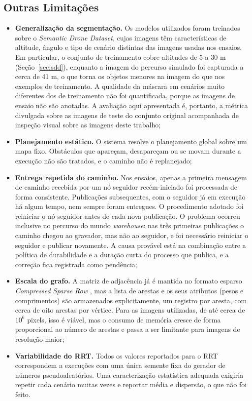 \documentclass[
    12pt,
    openright,
    oneside,
    a4paper,
    english,
    brazil
]{abntex2}
\begin{document}
\subsection{Outras Limitações}

\begin{itemize}
    \item \textbf{Generalização da segmentação.} Os modelos utilizados foram treinados sobre o \emph{Semantic Drone Dataset}, cujas imagens têm características de altitude, ângulo e tipo de cenário distintas das imagens usadas nos ensaios. Em particular, o conjunto de treinamento cobre altitudes de 5 a 30 m (Seção~\ref{sec:sdd}), enquanto a imagem do percurso simulado foi capturada a cerca de 41 m, o que torna os objetos menores na imagem do que nos exemplos de treinamento. A qualidade da máscara em cenários muito diferentes dos de treinamento não foi quantificada, porque as imagens de ensaio não são anotadas. A avaliação aqui apresentada é, portanto, a métrica divulgada sobre as imagens de teste do conjunto original acompanhada de inspeção visual sobre as imagens deste trabalho;
    \item \textbf{Planejamento estático.} O sistema resolve o planejamento global sobre um mapa fixo. Obstáculos que apareçam, desapareçam ou se movam durante a execução não são tratados, e o caminho não é replanejado;
    \item \textbf{Entrega repetida do caminho.} Nos ensaios, apenas a primeira mensagem de caminho recebida por um nó seguidor recém-iniciado foi processada de forma consistente. Publicações subsequentes, com o seguidor já em execução há algum tempo, nem sempre foram entregues. O procedimento adotado foi reiniciar o nó seguidor antes de cada nova publicação. O problema ocorreu inclusive no percurso do mundo \textit{warehouse}: nas três primeiras publicações o caminho chegou ao gravador, mas não ao seguidor, e foi necessário reiniciar o seguidor e publicar novamente. A causa provável está na combinação entre a política de durabilidade e a duração curta do processo que publica, e a correção fica registrada como pendência;
    \item \textbf{Escala do grafo.} A matriz de adjacência já é mantida no formato esparso \textit{Compressed Sparse Row} \cite{saad2003}, mas a lista de arestas e os seus atributos (pesos e comprimentos) são armazenados explicitamente, um registro por aresta, com cerca de oito arestas por vértice. Para as imagens utilizadas, de até cerca de $10^6$ pixels, isso é viável, mas o consumo de memória cresce de forma proporcional ao número de arestas e passa a ser limitante para imagens de resolução maior;
    \item \textbf{Variabilidade do RRT.} Todos os valores reportados para o RRT correspondem a execuções com uma única semente fixa do gerador de números pseudoaleatórios. Uma caracterização estatística adequada exigiria repetir cada cenário muitas vezes e reportar média e dispersão, o que não foi feito.
\end{itemize}
\end{document}
